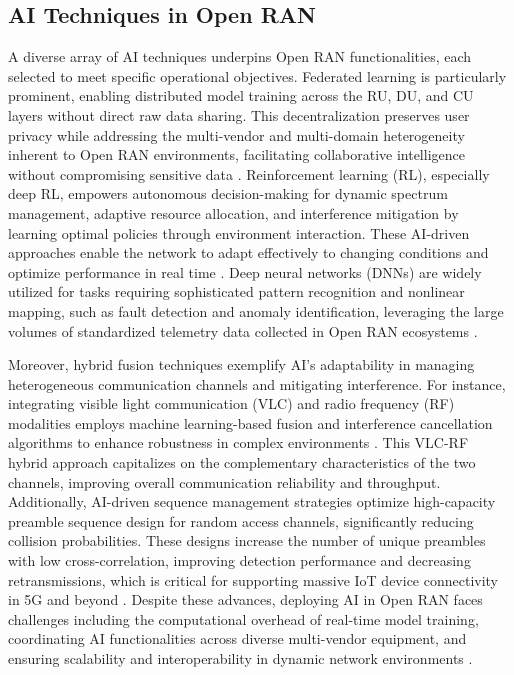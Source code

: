 \documentclass[sigconf]{acmart}
\begin{document}
\subsection{AI Techniques in Open RAN}

A diverse array of AI techniques underpins Open RAN functionalities, each selected to meet specific operational objectives. Federated learning is particularly prominent, enabling distributed model training across the RU, DU, and CU layers without direct raw data sharing. This decentralization preserves user privacy while addressing the multi-vendor and multi-domain heterogeneity inherent to Open RAN environments, facilitating collaborative intelligence without compromising sensitive data \cite{ref54}. Reinforcement learning (RL), especially deep RL, empowers autonomous decision-making for dynamic spectrum management, adaptive resource allocation, and interference mitigation by learning optimal policies through environment interaction. These AI-driven approaches enable the network to adapt effectively to changing conditions and optimize performance in real time \cite{ref21,ref22}. Deep neural networks (DNNs) are widely utilized for tasks requiring sophisticated pattern recognition and nonlinear mapping, such as fault detection and anomaly identification, leveraging the large volumes of standardized telemetry data collected in Open RAN ecosystems \cite{ref23,ref24}.

Moreover, hybrid fusion techniques exemplify AI’s adaptability in managing heterogeneous communication channels and mitigating interference. For instance, integrating visible light communication (VLC) and radio frequency (RF) modalities employs machine learning-based fusion and interference cancellation algorithms to enhance robustness in complex environments \cite{ref25}. This VLC-RF hybrid approach capitalizes on the complementary characteristics of the two channels, improving overall communication reliability and throughput. Additionally, AI-driven sequence management strategies optimize high-capacity preamble sequence design for random access channels, significantly reducing collision probabilities. These designs increase the number of unique preambles with low cross-correlation, improving detection performance and decreasing retransmissions, which is critical for supporting massive IoT device connectivity in 5G and beyond \cite{ref21}. Despite these advances, deploying AI in Open RAN faces challenges including the computational overhead of real-time model training, coordinating AI functionalities across diverse multi-vendor equipment, and ensuring scalability and interoperability in dynamic network environments \cite{ref49,ref54}.
\end{document}
